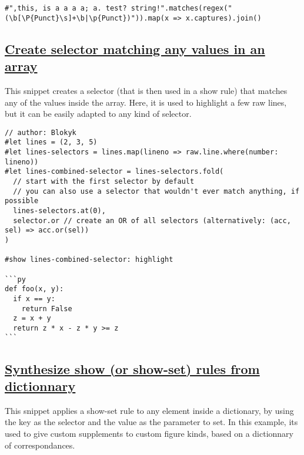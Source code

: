\begin{verbatim}
#",this, is a a a a; a. test? string!".matches(regex("(\b[\P{Punct}\s]+\b|\p{Punct})")).map(x => x.captures).join()
\end{verbatim}

\pandocbounded{}

\subsection{\texorpdfstring{\hyperref[create-selector-matching-any-values-in-an-array]{Create
selector matching any values in an
array}}{Create selector matching any values in an array}}\label{create-selector-matching-any-values-in-an-array}

This snippet creates a selector (that is then used in a show rule) that
matches any of the values inside the array. Here, it is used to
highlight a few raw lines, but it can be easily adapted to any kind of
selector.

\begin{verbatim}
// author: Blokyk
#let lines = (2, 3, 5)
#let lines-selectors = lines.map(lineno => raw.line.where(number: lineno))
#let lines-combined-selector = lines-selectors.fold(
  // start with the first selector by default
  // you can also use a selector that wouldn't ever match anything, if possible
  lines-selectors.at(0),
  selector.or // create an OR of all selectors (alternatively: (acc, sel) => acc.or(sel))
)

#show lines-combined-selector: highlight

```py
def foo(x, y):
  if x == y:
    return False
  z = x + y
  return z * x - z * y >= z
```
\end{verbatim}

\pandocbounded{}

\subsection{\texorpdfstring{\hyperref[synthesize-show-or-show-set-rules-from-dictionnary]{Synthesize
show (or show-set) rules from
dictionnary}}{Synthesize show (or show-set) rules from dictionnary}}\label{synthesize-show-or-show-set-rules-from-dictionnary}

This snippet applies a show-set rule to any element inside a dictionary,
by using the key as the selector and the value as the parameter to set.
In this example, it\textquotesingle s used to give custom supplements to
custom figure kinds, based on a dictionnary of correspondances.

